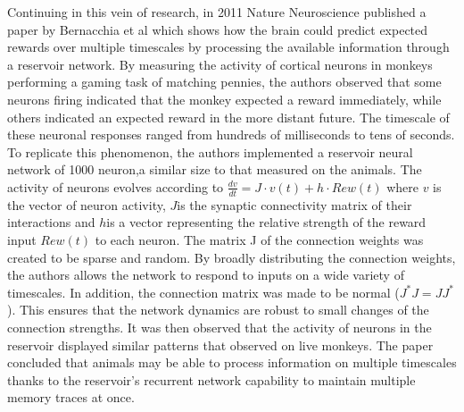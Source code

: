 \documentclass[12pt,oneside]{CUNY_CS_PhD}
\begin{document}
\noindent Continuing in this vein of research, in 2011 Nature Neuroscience published a paper by Bernacchia et al \cite{bernacchia_reservoir_2011} which shows how the brain could predict expected rewards over multiple timescales by processing the available information through a reservoir network. By measuring the activity of cortical neurons in monkeys performing a gaming task of matching pennies, the authors observed that some neurons firing indicated that the monkey expected a reward immediately, while others indicated an expected reward in the more distant future. The timescale of these neuronal responses ranged from hundreds of milliseconds to tens of seconds. To replicate this phenomenon, the authors implemented a reservoir neural network of 1000 neuron,a similar size to that measured on the animals. The activity of neurons evolves according to $\frac{dv}{dt} = J \cdot v(t) + h \cdot Rew(t)$ where $v$ is the vector of neuron activity, $J$is the synaptic connectivity matrix of their interactions and $h$is a vector representing the relative strength of the reward input $Rew(t)$ to each neuron. The matrix J of the connection weights was created to be sparse and random. By broadly distributing the connection weights, the authors allows the network to respond to inputs on a wide variety of timescales. In addition, the connection matrix was made to be normal ($J^*J = JJ^*$). This ensures \cite{Spectra2005} that the network dynamics are robust to small changes of the connection strengths. It was then observed that the activity of neurons in the reservoir displayed similar patterns that observed on live monkeys. The paper concluded that animals may be able to process information on multiple timescales thanks to the reservoir's recurrent network capability to maintain multiple memory traces at once.\newpage
\end{document}
